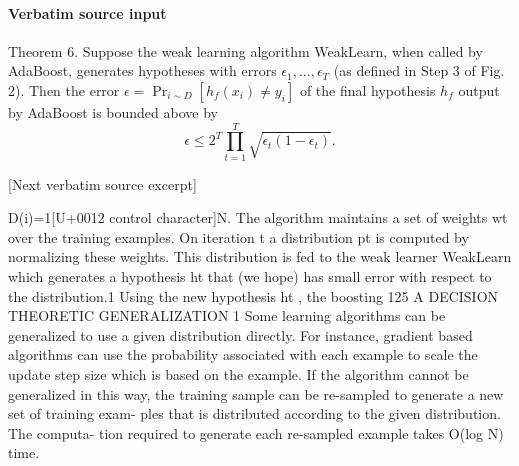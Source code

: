 \documentclass[10pt]{article}
\begin{document}
\paragraph{Verbatim source input}
\begin{ReviewVerbatim}
Theorem 6. Suppose the weak learning algorithm WeakLearn, when called by
AdaBoost, generates hypotheses with errors $\epsilon_1,\ldots,\epsilon_T$
(as defined in Step 3 of Fig. 2). Then the error
$\epsilon=\Pr_{i\sim D}[h_f(x_i)\neq y_i]$ of the final hypothesis $h_f$
output by AdaBoost is bounded above by
$$
\epsilon\leq 2^T\prod_{t=1}^T\sqrt{\epsilon_t(1-\epsilon_t)}. \tag{14}
$$

[Next verbatim source excerpt]

D(i)=1[U+0012 control character]N. The algorithm maintains a set of weights wt
over
the training examples. On iteration t a distribution pt
is
computed by normalizing these weights. This distribution is
fed to the weak learner WeakLearn which generates a
hypothesis ht that (we hope) has small error with respect to
the distribution.1
Using the new hypothesis ht , the boosting
125
A DECISION THEORETIC GENERALIZATION
1
Some learning algorithms can be generalized to use a given distribution
directly. For instance, gradient based algorithms can use the probability
associated with each example to scale the update step size which is based
on the example. If the algorithm cannot be generalized in this way, the
training sample can be re-sampled to generate a new set of training exam-
ples that is distributed according to the given distribution. The computa-
tion required to generate each re-sampled example takes O(log N) time.


\end{ReviewVerbatim}
\end{document}
